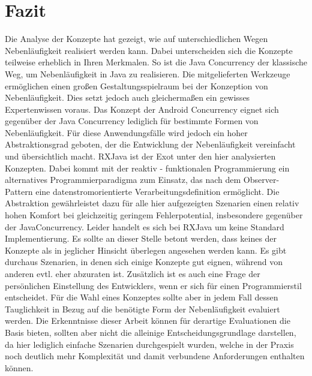 \documentclass[12pt,oneside,a4paper,bibtotoc,liststotoc]{scrreprt}
\begin{document}
\section{Fazit}
Die Analyse der Konzepte hat gezeigt, wie auf unterschiedlichen Wegen Nebenläufigkeit realisiert werden kann. Dabei unterscheiden sich die Konzepte teilweise erheblich in Ihren Merkmalen. So ist die Java Concurrency der klassische Weg, um Nebenläufigkeit in Java zu realisieren. Die mitgelieferten Werkzeuge ermöglichen einen großen Gestaltungsspielraum bei der Konzeption von Nebenläufigkeit. Dies setzt jedoch auch gleichermaßen ein gewisses Expertenwissen voraus. Das Konzept der Android Concurrency eignet sich gegenüber der Java Concurrency lediglich für bestimmte Formen von Nebenläufigkeit. Für diese Anwendungsfälle wird jedoch ein hoher Abstraktionsgrad geboten, der die Entwicklung der Nebenläufigkeit vereinfacht und übersichtlich macht. RXJava ist der Exot unter den hier analysierten Konzepten. Dabei kommt mit der reaktiv - funktionalen Programmierung ein alternatives Programmierparadigma zum Einsatz, das nach dem Observer- Pattern eine datenstromorientierte Verarbeitungsdefinition ermöglicht. Die Abstraktion gewährleistet dazu für alle hier aufgezeigten Szenarien einen relativ hohen Komfort bei gleichzeitig geringem Fehlerpotential, insbesondere gegenüber der JavaConcurrency. Leider handelt es sich bei RXJava um keine Standard Implementierung.\newline
Es sollte an dieser Stelle betont werden, dass keines der Konzepte als in jeglicher Hinsicht überlegen angesehen werden kann. Es gibt durchaus Szenarien, in denen sich einige Konzepte gut eignen, während von anderen evtl. eher abzuraten ist. Zusätzlich ist es auch eine Frage der persönlichen Einstellung des Entwicklers, wenn er sich für einen Programmierstil entscheidet. Für die Wahl eines Konzeptes sollte aber in jedem Fall dessen Tauglichkeit in Bezug auf die benötigte Form der Nebenläufigkeit evaluiert werden. Die Erkenntnisse dieser Arbeit können für derartige Evaluationen die Basis bieten, sollten aber nicht die alleinige Entscheidungsgrundlage darstellen, da hier lediglich einfache Szenarien durchgespielt wurden, welche in der Praxis noch deutlich mehr Komplexität und damit verbundene Anforderungen enthalten können. 
\end{document}

